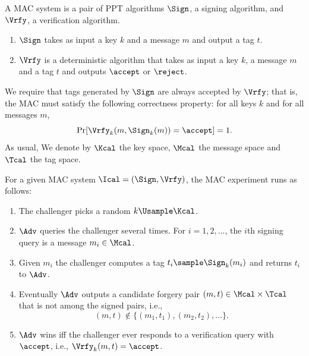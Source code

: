 \begin{problem}\label{p1}
    \leavevmode\par
    \begin{definition*}
        A MAC system is a pair of PPT algorithms $\Sign$, a signing algorithm, and $\Vrfy$, a verification algorithm.
        \begin{enumerate}[label=(\alph*)]
            \item $\Sign$ takes as input a key $k$ and a message $m$ and output a tag $t$.
            \item $\Vrfy$ is a deterministic algorithm that takes as input a key $k$, a message $m$ and a tag $t$ and outputs $\accept$ or $\reject$.
        \end{enumerate}
        We require that tags generated by $\Sign$ are always accepted by $\Vrfy$; that is, the MAC must satisfy the following correctness property: for all keys $k$ and for all messages $m$,
        \[
            \Pr[\Vrfy_k(m, \Sign_k(m))=\accept]=1.
        \]
        As usual, We denote by $\Kcal$ the key space, $\Mcal$ the message space and $\Tcal$ the tag space.
    \end{definition*}

    \begin{definition*}
        For a given MAC system $\Ical = (\Sign, \Vrfy)$, the MAC experiment runs as follows:
        \begin{enumerate}[label=(\alph*)]
            \item The challenger picks a random $k\Usample \Kcal$.
            \item $\Adv$ queries the challenger several times. For $i = 1, 2,\ldots $, the $i$th signing query is a message  $m_i\in\Mcal$.
            \item Given $m_i$ the challenger computes a tag $t_i\sample \Sign_k(m_i)$ and returns $t_i$ to $\Adv$.
            \item Eventually $\Adv$ outputs a candidate forgery pair $(m, t)\in \Mcal\times \Tcal$ that is not among the signed pairs, i.e.,
            \[
                (m,t)\notin \{(m_1, t_1), (m_2, t_2),\ldots\}.
            \]
            \item $\Adv$ wins iff the challenger ever responds to a verification query with $\accept$, i.e., $\Vrfy_k(m,t)=\accept$.
        \end{enumerate}
    \end{definition*}


\end{problem}
